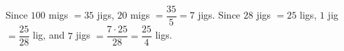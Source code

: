 Since $100$ migs $=35$ jigs, $20$ migs $=\dfrac{35}{5}=7$ jigs. Since $28$ jigs $=25$ ligs, $1$ jig $=\dfrac{25}{28}$ lig, and $7$ jigs $=\dfrac{7\cdot25}{28}=\boxed{\dfrac{25}{4}}$ ligs.

